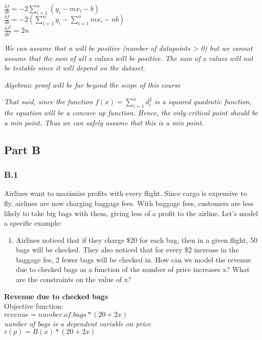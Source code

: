 \documentclass[11pt]{article}
\providecommand{\tightlist}{%
      \setlength{\itemsep}{0pt}\setlength{\parskip}{0pt}}
\begin{document}
\(\frac{\delta f}{\delta b} = -2\sum_{i=1}^{n}(y_i − mx_i - b)\)\\
\(\frac{\delta f}{\delta b} = -2(\sum_{i=1}^{n}y_i − \sum_{i=1}^{n}mx_i - nb)\)\\
\(\frac{\delta f^2}{\delta b^2} = 2n\)

\emph{We can assume that n will be positive (number of datapoints
\textgreater{} 0) but we cannot assume that the sum of all x values will
be positive. The sum of x values will not be testable since it will
depend on the dataset.}

\emph{Algebraic proof will be far beyond the scope of this course}

\emph{That said, since the function \(f(x) = \sum_{i=1}^{n} d^2_i\) is a
squared quadratic function, the equation will be a concave up function.
Hence, the only critical point should be a min point. Thus we can safely
assume that this is a min point.}

    \subsection{Part B}\label{part-b}

\subsubsection{B.1}\label{b.1}

Airlines want to maximize profits with every flight. Since cargo is
expensive to fly, airlines are now charging baggage fees. With baggage
fees, customers are less likely to take big bags with them, giving less
of a profit to the airline. Let's model a specific example:

\begin{enumerate}
\def\labelenumi{(\alph{enumi})}
\tightlist
\item
  Airlines noticed that if they charge \$20 for each bag, then in a
  given flight, 50 bags will be checked. They also noticed that for
  every \$2 increase in the baggage fee, 2 fewer bags will be checked
  in. How can we model the revenue due to checked bags as a function of
  the number of price increases x? What are the constraints on the value
  of x?
\end{enumerate}

    \textbf{Revenue due to checked bags}\\
Objective function:\\
\(revenue = number.of.bags * (20+2x)\)\\
\emph{number of bags is a dependent variable on price}\\
\(r(p) = B(x)*(20+2x)\)
\end{document}
